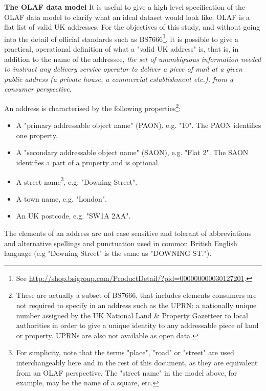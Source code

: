\textbf{The OLAF data model} It is useful to give a high level specification of the OLAF data model to clarify what an ideal dataset would look like. OLAF is a flat list of valid UK addresses. For the objectives of this study, and without going into the detail of official standards such as BS7666\footnote{See \url{http://shop.bsigroup.com/ProductDetail/?pid=000000000030127201}.}, it is possible to give a practical, operational definition of what a "valid UK address" is, that is, in addition to the name of the addressee, {\it the set of unambiguous information needed to instruct any delivery service operator to deliver a piece of mail at a given public address (a private house, a commercial establishment etc.), from a consumer perspective}. 

An address is characterised by the following properties\footnote{These are actually a subset of BS7666, that includes elements consumers are not required to specify in an address such as the UPRN: a nationally unique number assigned by the UK National Land \& Property Gazetteer to local authorities in order to give a unique identity to any addressable piece of land or property. UPRNs are also not available as open data.}:

\begin{itemize}
    \item A "primary addressable object name" (PAON), e.g. "10". The PAON identifies one property.
    \item A "secondary addressable object name" (SAON), e.g. "Flat 2". The SAON identifies a part of a property and is optional.
    \item A street name\footnote{For simplicity, note that the terms "place", "road" or "street" are used interchangeably here and in the rest of this document, as they are equivalent from an OLAF perspective. The "street name" in the model above, for example, may be the name of a square, etc.}, e.g. "Downing Street".
    \item A town name, e.g. "London".
    \item An UK postcode, e.g. "SW1A 2AA".
\end{itemize}

The elements of an address are not case sensitive and tolerant of abbreviations and alternative spellings and punctuation used in common British English language (e.g "Downing Street" is the same as "DOWNING ST.").
